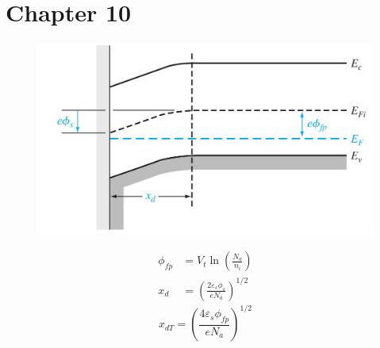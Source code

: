 \documentclass[a4paper, twocolumn]{article}
\begin{document}
\renewcommand{\thesection}{\Roman{section}}
\renewcommand{\thesubsection}{\Alph{subsection}}
\renewcommand{\thesubsubsection}{\thesubsection.\arabic{subsubsection}}
\renewcommand{\d}{\: \mathrm{d} }
\newcommand{\e}{\mathrm{e}}

\section{Chapter 10}
    \begin{figure}[H]
        \centering
        \includegraphics[width=0.9\linewidth]{Energy-band-diagram-PMOS-and-surface-potential.jpg}
        \label{fig:Energy-band-diagram-PMOS-and-surface-potential.jpg}
    \end{figure}
    \begin{equation*}
        \begin{aligned}
            \phi_{fp} &= V_t \ln \left( \frac{N_a}{n_i}  \right) \\
            x_d &= \left( \frac{2 \varepsilon_s \phi_s}{e N_a}  \right)^{1/2} 
        \end{aligned}
    \end{equation*}
    \begin{equation*}
        \boxed{x_{dT} = \left( \frac{4\varepsilon_s \phi_{fp} }{e N_a} \right)^{1/2}}
    \end{equation*}
    
\end{document}
